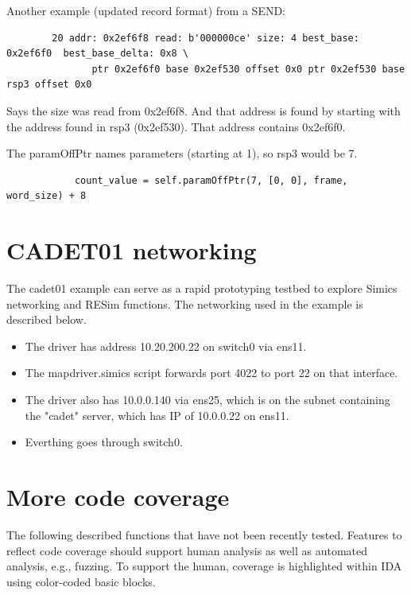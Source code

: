 \documentclass[titlepage]{article}
\begin{document}
\begin{appendices}
Another example (updated record format) from a SEND:
\begin{verbatim}
        20 addr: 0x2ef6f8 read: b'000000ce' size: 4 best_base: 0x2ef6f0  best_base_delta: 0x8 \
               ptr 0x2ef6f0 base 0x2ef530 offset 0x0 ptr 0x2ef530 base rsp3 offset 0x0
\end{verbatim}
Says the size was read from 0x2ef6f8.  And that address is found by starting with the address found in rsp3 (0x2ef530).
That address contains 0x2ef6f0. 

The paramOffPtr names parameters (starting at 1), so rsp3 would be 7. 
\begin{verbatim}
            count_value = self.paramOffPtr(7, [0, 0], frame, word_size) + 8
\end{verbatim}

\section{CADET01 networking}
The cadet01 example can serve as a rapid prototyping testbed to explore Simics networking and RESim functions.
The networking used in the example is described below.
\begin{itemize}
\item The driver has address 10.20.200.22 on switch0 via ens11.  
\item The mapdriver.simics script forwards port 4022 to
port 22 on that interface.  
\item The driver also has 10.0.0.140 via ens25, which is on the subnet containing the
"cadet" server, which has IP of 10.0.0.22 on ens11.  
\item Everthing goes through switch0.
\end{itemize}

\section{More code coverage}
The following described functions that have not been recently tested.
Features to reflect code coverage should support human analysis as well as automated analysis, e.g., fuzzing.  To support the human, coverage is highlighted within IDA using color-coded basic blocks.  


\end{appendices}
\end{document}
